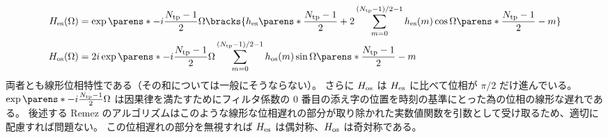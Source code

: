                 \begin{align*}
                    \Hes(\Omega) &= \exp\parens*{-i\frac{\Ntp-1}{2}\Omega}\bracks{\hes\parens*{\frac{\Ntp-1}{2}} + 2\sum_{m=0}^{(\Ntp-1)/2-1}{\hes(m)\cos\Omega\parens*{\frac{\Ntp-1}{2}-m}}} \\
                    \Hos(\Omega) &= 2i\exp\parens*{-i\frac{\Ntp-1}{2}\Omega}\sum_{m=0}^{(\Ntp-1)/2-1}{\hos(m)\sin\Omega\parens*{\frac{\Ntp-1}{2}-m}}
                \end{align*}
                両者とも線形位相特性である（その和については一般にそうならない）。
                さらに $H_{\text{os}}$ は $H_{\text{es}}$ に比べて位相が $\pi/2$ だけ進んでいる。
                $\exp\parens*{-i\frac{\Ntp-1}{2}\Omega}$ は因果律を満たすためにフィルタ係数の 0 番目の添え字の位置を時刻の基準にとった為の位相の線形な遅れである。
                後述する Remez のアルゴリズムはこのような線形な位相遅れの部分が取り除かれた実数値関数を引数として受け取るため、適切に配慮すれば問題ない。
                この位相遅れの部分を無視すれば $H_{\text{es}}$ は偶対称、$H_{\text{os}}$ は奇対称である。
